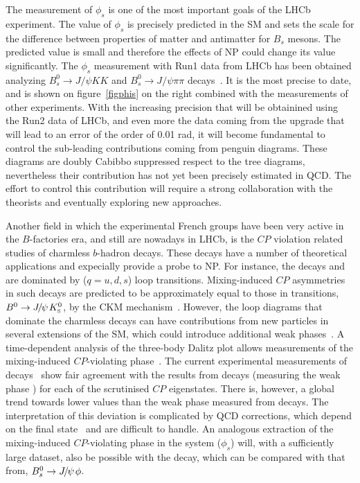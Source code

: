 The measurement of $\phi_{s}$ is one of the most important goals of the LHCb experiment. The value of $\phi_{s}$ is precisely predicted in the SM and sets the scale for the difference between properties of matter and antimatter for $B_s$ mesons. The predicted value is small and therefore the effects of NP could change its value significantly. The $\phi_{s}$ measurement with Run1 data from LHCb has been obtained analyzing $B^{0}_{s} \to J/\psi K K$ and $B^{0}_{s} \to J/\psi \pi \pi$ decays~\cite{Aaij:2014zsa}. It  is the most precise to date, and is shown on figure~\ref{figphis} on the right combined with the measurements of other experiments. With the increasing precision that will be obtainined using the Run2 data of LHCb, and even more the data coming from the upgrade that will lead to an error of the order of 0.01 rad, it will become fundamental to control the sub-leading contributions coming from penguin diagrams. These diagrams are doubly Cabibbo suppressed respect to the tree diagrams, nevertheless their contribution has not yet been precisely estimated in QCD.  The effort to control this contribution will require a strong collaboration with the theorists and eventually exploring new approaches. 


Another field in which the experimental French groups have been  very active in the $B$-factories era, and still are nowadays in LHCb, is the $CP$ violation related studies of charmless $b$-hadron decays.  These decays have a number of theoretical applications and expecially provide a probe to NP. For instance, the decays \BdtoKsPiPi and \BdtoKsKK are dominated by \btoqqbars ($q = u,d,s$) loop transitions.  Mixing-induced $CP$ asymmetries in such decays are predicted to be approximately equal to those in \btoccbars transitions, \eg ${{B}^0}\rightarrow{\ensuremath{{J\mskip -3mu/\mskip -2mu\psi\mskip 2mu}}}{\ensuremath{{K}^0_{\rm\scriptscriptstyle S}}}$, by the
CKM mechanism~\cite{Cabibbo:1963yz,Kobayashi:1973fv}.
However, the loop diagrams that dominate the charmless decays can have
contributions from new particles in several extensions of the SM,
which could introduce additional weak phases~\cite{Buchalla:2005us,Grossman:1996ke,London:1997zk,Ciuchini:1997zp}.
A time-dependent analysis of the three-body Dalitz plot allows measurements of
the mixing-induced $CP$-violating
phase~\cite{Dalseno:2008wwa,Aubert:2009me,Nakahama:2010nj,Lees:2012kxa}. 
 The current experimental measurements of \btoqqbars decays~\cite{HFAG} show
fair agreement with the results from \btoccbars decays (measuring the weak
phase \Pbeta) for each of the scrutinised $CP$ eigenstates.
There is, however, a global trend towards lower values than the weak phase
measured from \btoccbars decays.
The interpretation of this deviation is complicated by QCD
corrections, which depend on the final state~\cite{Silvestrini:2007yf} and
are difficult to handle.
An analogous extraction of the mixing-induced $CP$-violating phase in the
\Bs system ($\phi_s$) will, with a sufficiently large dataset, also be possible with
the \BstoKsKPi decay, which can be compared with that from, \eg
${{B}^0_{s}}\rightarrow{\ensuremath{{J\mskip -3mu/\mskip -2mu\psi\mskip 2mu}}}\phi$.

